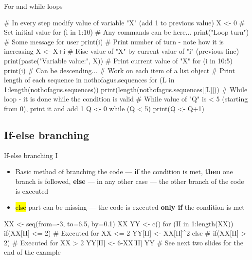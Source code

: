 \documentclass[compress, ucs, xelatex, 11pt, xcolor=svgnames,
	hyperref={
		bookmarks=true,
		unicode=true,
		colorlinks=true,
		pdftitle={Molecular data in R},
		plainpages=false,
		pdfauthor={Vojtech Zeisek},
		pdfsubject={Course about phylogeny and evolution in R},
		pdfcreator={XeLaTeX},
		pdfkeywords={R, evolution, phylogeny, molecular data},
		linkcolor=Tomato,
		anchorcolor=SaddleBrown,
		citecolor=Goldenrod,
		filecolor=DarkMagenta,
		menucolor=Sienna,
		urlcolor=DarkTurquoise,
		pdftex},
	url={hyphens, lowtilde} %
	]{beamer}
\renewcommand{\texttt}[1]{\hl{\ttfamily #1}}
\begin{document}
\begin{frame}[fragile]{For and while loops}
	\begin{spluscode}
    # In every step modify value of variable "X" (add 1 to previous value)
    X <- 0 # Set initial value
    for (i in 1:10) {
      # Any commands can be here...
      print("Loop turn") # Some message for user
      print(i) # Print number of turn - note how it is increasing
      X <- X+i # Rise value of "X" by current value of "i" (previous line)
      print(paste("Variable value:", X)) # Print current value of "X"
      }
    for (i in 10:5) { print(i) } # Can be descending...
    # Work on each item of a list object
    # Print length of each sequence in nothofagus.sequences
    for (L in 1:length(nothofagus.sequences)) {
      print(length(nothofagus.sequences[[L]])) }
    # While loop - it is done while the condition is valid
    # While value of "Q" is < 5 (starting from 0), print it and add 1
    Q <- 0
    while (Q < 5) { print(Q <- Q+1) }
	\end{spluscode}
\end{frame}

\subsection{If-else branching}

\begin{frame}[fragile]{If-else branching I}
	\begin{itemize}
		\item Basic method of branching the code --- \textbf{if} the condition is met, \textbf{then} one branch is followed, \textbf{else} --- in any other case --- the other branch of the code is executed
		\item \texttt{else} part can be missing --- the code is executed \textbf{only if} the condition is met
	\end{itemize}
	\begin{spluscode}
    XX <- seq(from=-3, to=6.5, by=0.1)
    XX
    YY <- c()
    for (II in 1:length(XX)) {
      if(XX[II] <= 2) { # Executed for XX <= 2
        YY[II] <- XX[II]^2
        } else { # if(XX[II] > 2) # Executed for XX > 2
          YY[II] <- 6-XX[II]
          }
      }
    YY # See next two slides for the end of the example
	\end{spluscode}
\end{frame}
\end{document}
